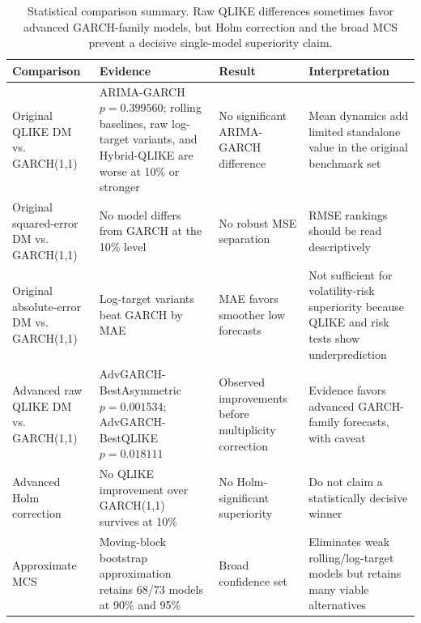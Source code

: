 \begin{table}[!t]
\centering
\caption{Statistical comparison summary. Raw QLIKE differences sometimes favor advanced GARCH-family models, but Holm correction and the broad MCS prevent a decisive single-model superiority claim.}
\label{tab:stat-tests}
\scriptsize
\setlength{\tabcolsep}{4pt}
\begin{tabular}{@{}p{}p{}p{}p{}@{}}
\toprule
Comparison & Evidence & Result & Interpretation \\
\midrule
Original QLIKE DM vs. GARCH(1,1) & ARIMA-GARCH \(p=0.399560\); rolling baselines, raw log-target variants, and Hybrid-QLIKE are worse at 10\% or stronger & No significant ARIMA-GARCH difference & Mean dynamics add limited standalone value in the original benchmark set \\
Original squared-error DM vs. GARCH(1,1) & No model differs from GARCH at the 10\% level & No robust MSE separation & RMSE rankings should be read descriptively \\
Original absolute-error DM vs. GARCH(1,1) & Log-target variants beat GARCH by MAE & MAE favors smoother low forecasts & Not sufficient for volatility-risk superiority because QLIKE and risk tests show underprediction \\
Advanced raw QLIKE DM vs. GARCH(1,1) & AdvGARCH-BestAsymmetric \(p=0.001534\); AdvGARCH-BestQLIKE \(p=0.018111\) & Observed improvements before multiplicity correction & Evidence favors advanced GARCH-family forecasts, with caveat \\
Advanced Holm correction & No QLIKE improvement over GARCH(1,1) survives at 10\% & No Holm-significant superiority & Do not claim a statistically decisive winner \\
Approximate MCS & Moving-block bootstrap approximation retains 68/73 models at 90\% and 95\% & Broad confidence set & Eliminates weak rolling/log-target models but retains many viable alternatives \\
\bottomrule
\end{tabular}
\end{table}
